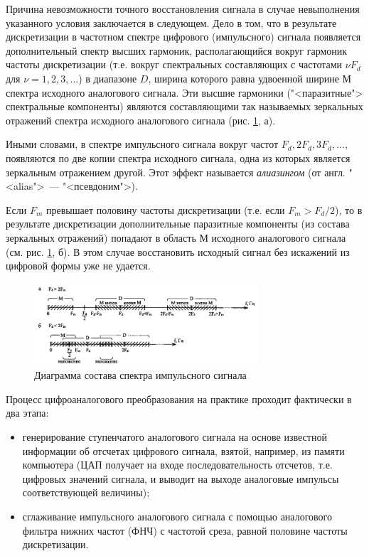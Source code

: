 \documentclass[oneside, final, 14pt]{extreport}
\begin{document}
Причина невозможности точного восстановления сигнала в случае невыполнения указанного условия заключается в следующем. Дело в том, что в результате дискретизации в частотном спектре цифрового (импульсного) сигнала появляется дополнительный спектр высших гармоник, располагающийся вокруг гармоник частоты дискретизации (т.е. вокруг спектральных составляющих с частотами $\nu F_d$ для $\nu=1, 2, 3, ...$) в диапазоне $D$, ширина которого равна удвоенной ширине $М$ спектра исходного аналогового сигнала. Эти высшие гармоники ("<паразитные"> спектральные компоненты) являются составляющими так называемых зеркальных отражений спектра исходного аналогового сигнала (рис. \ref{pic-digital-07}, а). 

Иными словами, в спектре импульсного сигнала вокруг частот $F_d, 2F_d, 3F_d,...$, появляются по две копии спектра исходного сигнала, одна из которых является зеркальным отражением другой. Этот эффект называется \textit{алиазингом} (от англ. "<alias">~--- "<псевдоним">).

Если $F_m$ превышает половину частоты дискретизации  (т.е. если $F_m>F_d/2$), то в результате дискретизации дополнительные паразитные компоненты (из состава зеркальных отражений) попадают в область $М$ исходного аналогового сигнала (см. рис. \ref{pic-digital-07}, б). В этом случае восстановить исходный сигнал без искажений из цифровой формы уже не удается.

\begin{figure}[h]
\centering
\includegraphics[width=0.75\textwidth]{pic-digital-07}
\caption{Диаграмма состава спектра импульсного сигнала}
\label{pic-digital-07}
\end{figure}

Процесс цифроаналогового преобразования на практике проходит фактически в два этапа:
\begin{itemize}
\item генерирование ступенчатого аналогового сигнала на основе известной информации об отсчетах цифрового сигнала, взятой, например, из памяти компьютера (ЦАП получает на входе последовательность отсчетов, т.е. цифровых значений сигнала, и выводит на выходе аналоговые импульсы соответствующей величины);
\item сглаживание импульсного аналогового сигнала с помощью аналогового фильтра нижних частот (ФНЧ) с частотой среза, равной половине частоты дискретизации.
\end{itemize}
\end{document}
